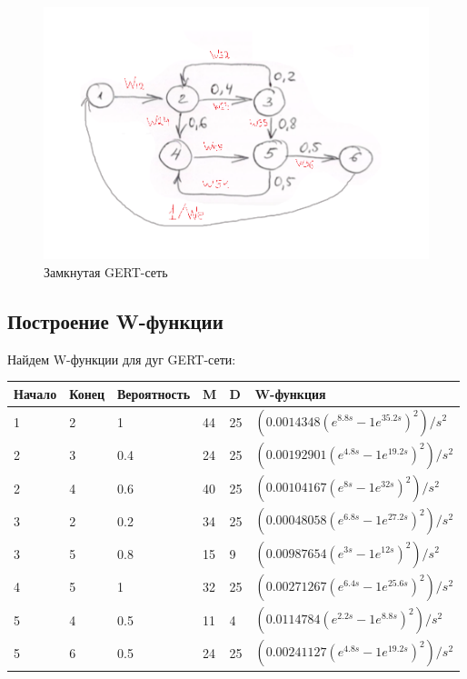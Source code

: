 \documentclass[14pt,a4paper,report]{report}
\begin{document}
\begin{figure}[h!]
	\centering
	\includegraphics[scale = 0.65]{images/1.png}
	\caption{Замкнутая GERT-сеть}
	\label{image:1}
\end{figure}

\subsection{Построение W-функции}

Найдем W-функции для дуг GERT-сети:

\begin{table}[h!]
	\bgroup
	\def\arraystretch{1}
	\begin{tabular}{ | m{1.5cm} | m{1.5cm} | m{2.0cm} | m{1.0cm} | m{1.0cm} | m{5.0cm} | }
		\hline
		Начало & Конец & Вероятность & M & D & W-функция \\ \hline
		1 &  2 & 1 		& 44 & 25 & $(0.0014348 (e^{8.8 s} - 1 e^{35.2 s})^2)/s^2$ \\ \hline
		2 & 3 & 0.4  & 24 & 25 & $(0.00192901 (e^{4.8 s} - 1 e^{19.2 s})^2)/s^2$ \\ \hline
		2 & 4 & 0.6 	& 40 & 25 & $(0.00104167 (e^{8 s} - 1 e^{32 s})^2)/s^2$ \\ \hline
		3 & 2 & 0.2 	& 34 & 25 & $(0.00048058 (e^{6.8 s} - 1 e^{27.2 s})^2)/s^2$ \\ \hline
		3 & 5 & 0.8 	& 15 & 9 &    $(0.00987654 (e^{3 s} - 1 e^{12 s})^2)/s^2$ \\ \hline
		4 & 5 & 1 		& 32 & 25 & $(0.00271267 (e^{6.4 s} - 1 e^{25.6 s})^2)/s^2$ \\ \hline
		5 & 4 & 0.5 	& 11 & 4 &    $(0.0114784 (e^{2.2 s} - 1 e^{8.8 s})^2)/s^2$ \\ \hline
		5 & 6 & 0.5 	& 24 & 25 & $(0.00241127 (e^{4.8 s} - 1 e^{19.2 s})^2)/s^2$ \\ \hline
	\end{tabular}
	\egroup
\end{table}
\end{document}
